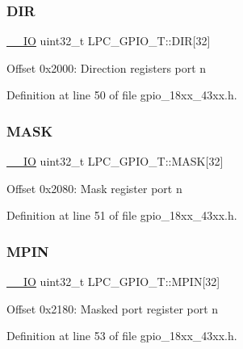 \subsubsection{\texorpdfstring{D\+IR}{DIR}}
{\footnotesize\ttfamily \hyperlink{core__sc300_8h_aec43007d9998a0a0e01faede4133d6be}{\+\_\+\+\_\+\+IO} uint32\+\_\+t L\+P\+C\+\_\+\+G\+P\+I\+O\+\_\+\+T\+::\+D\+IR\mbox{[}32\mbox{]}}

Offset 0x2000\+: Direction registers port n 

Definition at line 50 of file gpio\+\_\+18xx\+\_\+43xx.\+h.

\mbox{\label{struct_l_p_c___g_p_i_o___t_ac3a6d577e23cd7061700b2555a84827c}} 
\subsubsection{\texorpdfstring{M\+A\+SK}{MASK}}
{\footnotesize\ttfamily \hyperlink{core__sc300_8h_aec43007d9998a0a0e01faede4133d6be}{\+\_\+\+\_\+\+IO} uint32\+\_\+t L\+P\+C\+\_\+\+G\+P\+I\+O\+\_\+\+T\+::\+M\+A\+SK\mbox{[}32\mbox{]}}

Offset 0x2080\+: Mask register port n 

Definition at line 51 of file gpio\+\_\+18xx\+\_\+43xx.\+h.

\mbox{\label{struct_l_p_c___g_p_i_o___t_a76b2d3f4c151c8c89030dcd5e53ec1f8}} 
\subsubsection{\texorpdfstring{M\+P\+IN}{MPIN}}
{\footnotesize\ttfamily \hyperlink{core__sc300_8h_aec43007d9998a0a0e01faede4133d6be}{\+\_\+\+\_\+\+IO} uint32\+\_\+t L\+P\+C\+\_\+\+G\+P\+I\+O\+\_\+\+T\+::\+M\+P\+IN\mbox{[}32\mbox{]}}

Offset 0x2180\+: Masked port register port n 

Definition at line 53 of file gpio\+\_\+18xx\+\_\+43xx.\+h.

\mbox{\label{struct_l_p_c___g_p_i_o___t_aa795ddb42bf007fa85439fffc02536ac}} 
